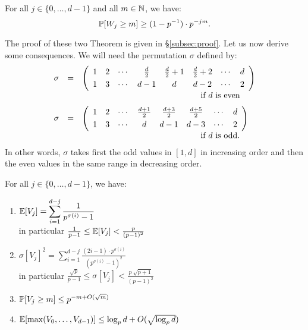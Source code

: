 \documentclass{sig-alternate}
\begin{document}
\begin{theo}
\label{th:estimWj}
For all $j \in \{0, \ldots, d-1\}$ and all $m \in \N$, we have:
$$\P[W_j \geq m] \geq (1 - p^{-1}) \cdot p^{-jm}.$$
\end{theo}

The proof of these two Theorem is given in \S \ref{subsec:proof}. 
Let us now derive some consequences. We will need the permutation
$\sigma$ defined by:
$$\begin{array}{rcl}
\sigma & = & \left(
\begin{array}{cccccccc}
1 & 2 & \cdots & \frac d 2 & \frac d 2 + 1 & \frac d 2 + 2 & \cdots & d \smallskip \\
1 & 3 & \cdots & d-1 & d & d-2 & \cdots & 2 
\end{array} \right) \\
& & \hspace{5cm} \text{if $d$ is even} \medskip \\
\sigma & = & \left(
\begin{array}{cccccccc}
1 & 2 & \cdots & \frac{d+1} 2 & \frac{d+3} 2 & \frac{d+5} 2 & \cdots & d \smallskip \\
1 & 3 & \cdots & d & d-1 & d-3 & \cdots & 2 
\end{array} \right) \\
& & \hspace{5cm} \text{if $d$ is odd.} \\
\end{array}$$
In other words, $\sigma$ takes first the odd values in $[1,d]$ in 
increasing order and then the even values in the same range in 
decreasing order.

\begin{cor}
\label{cor:Vj}
For all $j \in \{0, \ldots, d-1\}$, we have:

\vspace{-0.15cm}
\begin{enumerate}[\hspace{0.3cm}(1)]
\item $\E[V_j] = 
\displaystyle \sum_{i=1}^{d-j} \frac 1 {p^{\sigma(i)} - 1}$ \\
in particular $\frac 1 {p-1} \leq \E[V_j] < \frac p {(p-1)^2}$
\item $\sigma[V_j]^2 = 
\displaystyle \sum_{i=1}^{d-j} \frac {(2i-1) \cdot p^{\sigma(i)}}
{(p^{\sigma(i)} - 1)^2}$ \\
in particular $\frac{\sqrt p}{p-1} \leq \sigma[V_j] < 
\frac {p \:\sqrt{p+1}} {(p-1)^2}$
\item $\P[V_j \geq m] \leq p^{-m + O(\sqrt m)}$
\item $\E[\max(V_0, \ldots, V_{d-1})] \leq \log_p d + O(\sqrt{\log_p d})$
\end{enumerate}
\end{cor}
\end{document}
